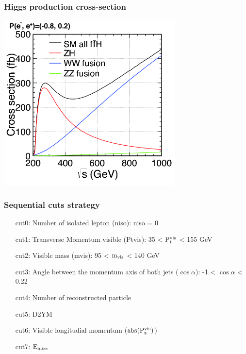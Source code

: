 \documentclass{beamer}
\begin{document}
  \begin{frame}[plain,label=Xsec]
    \frametitle{Higgs production cross-section}

    \begin{center}
      \includegraphics[width = 0.7\textwidth]{Pictures/higgs_xsec_P-8_3.png}
    \end{center}
  \end{frame}

 
  \begin{frame}[plain,label=cuts]
  \frametitle{Sequential cuts strategy}
      \begin{enumerate}
          \item [cut0:] Number of isolated lepton (niso): niso = 0 %
          \item [cut1:] Transverse Momentum visible (Ptvis): 35 < $\rm{P_{t}^{vis}}$ < 155 GeV
          \item [cut2:] Visible mass (mvis): 95 < $\rm{m_{vis}}$ < 140 GeV
          \item [cut3:] Angle between the momentum axis of both jets ($\cos{\alpha}$): -1 < $\cos{\alpha}$ < 0.22
          \item [cut4:] Number of reconstructed particle 
          \item [cut5:] D2YM
          \item [cut6:] Visible longitudial momentum ($\rm{abs(P_{z}^{vis})}$)
          \item [cut7:] $\rm{E_{miss}}$
      \end{enumerate}
  \end{frame}
\end{document}
